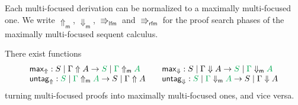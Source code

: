 \documentclass[runningheads]{llncs}
\newcommand{\lfm}{\Rrightarrow_\mathsf{lfm}}
\newcommand{\rfm}{\Rrightarrow_\mathsf{rfm}}
\newcommand{\lf}{\Rrightarrow_\mathsf{lf}}
\newcommand{\rf}{\Rrightarrow_\mathsf{rf}}
\newcommand{\green}[1]{{\color{Green}#1}}
\newcommand{\up}{\Uparrow}
\newcommand{\dn}{\Downarrow}
\newcommand{\upm}{\Uparrow_{\mathsf{m}}}
\newcommand{\dnm}{\Downarrow_{\mathsf{m}}}
\begin{document}
Each multi-focused derivation can be normalized to a maximally multi-focused one. We write $\upm$, $\dnm$, $\lfm$ and $\rfm$ for the proof search phases of the maximally multi-focused sequent calculus.
\begin{theorem}\label{thm2}
  There exist functions
  \[
  \begin{array}{l@{\qquad}l}
    \mathsf{max}_\up : S \mid \Gamma \up A \to \green{S} \mid \green{\Gamma} \upm \green{A} &
    \mathsf{max}_\dn : S \mid \Gamma \dn A \to \green{S} \mid \green{\Gamma} \dnm \green{A} \\
    \mathsf{untag}_\up : \green{S} \mid \green{\Gamma} \upm \green{A} \to S \mid \Gamma \up A &
\mathsf{untag}_\dn : \green{S} \mid \green{\Gamma} \dnm \green{A} \to S \mid \Gamma \dn A 
  \end{array}
  \]
 turning multi-focused proofs into maximally multi-focused ones, and vice versa.
\end{theorem}
\end{document}
